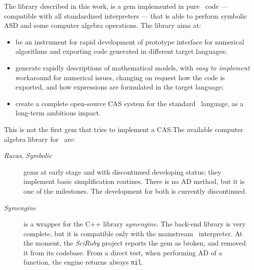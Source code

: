 The library described in this work, is a gem implemented in pure \Ruby~code --- compatible with all standardized interpreters --- that is able to perform symbolic ASD and some computer algebra operations. The library aims at:
\begin{itemize}
  \item be an instrument for rapid development of prototype interface for numerical algorithms and exporting code generated in different target languages;
  \item generate rapidly descriptions of mathematical models, with \emph{easy to implement} workaround for numerical issues, changing on request how the code is exported, and how expressions are formulated in the target language;
  \item create a complete open-source CAS system for the standard \Ruby~language, as a long-term ambitious impact.
\end{itemize}

This is not the first gem that tries to implement a CAS.\@ The available computer algebra library for \Ruby~are:
\begin{description}
  \item [\emph{Rucas}, \emph{Symbolic}] gems at early stage and with discontinued developing status; they implement basic simplification routines. There is no AD method, but it is one of the milestones. The development for both is currently discontinued.
  \item [\emph{Symengine}] is a wrapper for the C++ library \emph{symengine}. The back-end library is very complete, but it is compatible only with the mainstream \Ruby~interpreter. At the moment, the \emph{SciRuby} project reports the gem as broken, and removed it from its codebase. From a direct test, when performing AD of a function, the engine returns always \texttt{nil}.
\end{description}
